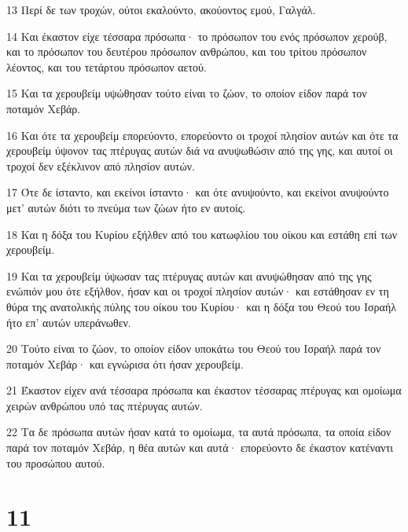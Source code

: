 \par 13 Περί δε των τροχών, ούτοι εκαλούντο, ακούοντος εμού, Γαλγάλ.
\par 14 Και έκαστον είχε τέσσαρα πρόσωπα· το πρόσωπον του ενός πρόσωπον χερούβ, και το πρόσωπον του δευτέρου πρόσωπον ανθρώπου, και του τρίτου πρόσωπον λέοντος, και του τετάρτου πρόσωπον αετού.
\par 15 Και τα χερουβείμ υψώθησαν τούτο είναι το ζώον, το οποίον είδον παρά τον ποταμόν Χεβάρ.
\par 16 Και ότε τα χερουβείμ επορεύοντο, επορεύοντο οι τροχοί πλησίον αυτών και ότε τα χερουβείμ ύψονον τας πτέρυγας αυτών διά να ανυψωθώσιν από της γης, και αυτοί οι τροχοί δεν εξέκλινον από πλησίον αυτών.
\par 17 Ότε δε ίσταντο, και εκείνοι ίσταντο· και ότε ανυψούντο, και εκείνοι ανυψούντο μετ' αυτών διότι το πνεύμα των ζώων ήτο εν αυτοίς.
\par 18 Και η δόξα του Κυρίου εξήλθεν από του κατωφλίου του οίκου και εστάθη επί των χερουβείμ.
\par 19 Και τα χερουβείμ ύψωσαν τας πτέρυγας αυτών και ανυψώθησαν από της γης ενώπιόν μου ότε εξήλθον, ήσαν και οι τροχοί πλησίον αυτών· και εστάθησαν εν τη θύρα της ανατολικής πύλης του οίκου του Κυρίου· και η δόξα του Θεού του Ισραήλ ήτο επ' αυτών υπεράνωθεν.
\par 20 Τούτο είναι το ζώον, το οποίον είδον υποκάτω του Θεού του Ισραήλ παρά τον ποταμόν Χεβάρ· και εγνώρισα ότι ήσαν χερουβείμ.
\par 21 Έκαστον είχεν ανά τέσσαρα πρόσωπα και έκαστον τέσσαρας πτέρυγας και ομοίωμα χειρών ανθρώπου υπό τας πτέρυγας αυτών.
\par 22 Τα δε πρόσωπα αυτών ήσαν κατά το ομοίωμα, τα αυτά πρόσωπα, τα οποία είδον παρά τον ποταμόν Χεβάρ, η θέα αυτών και αυτά· επορεύοντο δε έκαστον κατέναντι του προσώπου αυτού.

\chapter{11}

